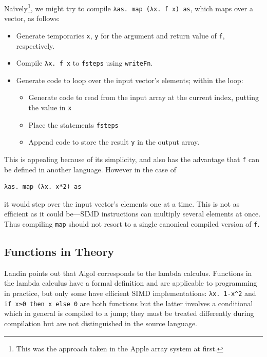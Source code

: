 \documentclass{article}
\begin{document}
Na\"ively\footnote{This was the approach taken in the Apple array system at first.}, we might try to compile \verb|λas. map (λx. f x) as|, which maps over a vector, as follows:

\begin{itemize}
  \item Generate temporaries \verb|x|, \verb|y| for the argument and return value of \verb|f|, respectively.
  \item Compile \verb|λx. f x| to \verb|fsteps| using \verb|writeFn|.
  \item Generate code to loop over the input vector's elements; within the loop:
    \begin{itemize}
      \item Generate code to read from the input array at the current index, putting the value in \verb|x|
      \item Place the statements \verb|fsteps|
      \item Append code to store the result \verb|y| in the output array.
    \end{itemize}
\end{itemize}

This is appealing because of its simplicity, and also has the advantage that \verb|f| can be defined in another language. However in the case of

\begin{verbatim}
λas. map (λx. x*2) as
\end{verbatim}

it would step over the input vector's elements one at a time. This is not as efficient as it could be---SIMD instructions can multiply several elements at once. Thus compiling \verb|map| should not resort to a single canonical compiled version of \verb|f|.


\subsection{Functions in Theory}

Landin \cite{landin1965} points out that Algol corresponds to the lambda calculus. Functions in the lambda calculus have a formal definition and are applicable to programming in practice, but only some have efficient SIMD implementations: \verb|λx. 1-x^2| and \verb|if x≥0 then x else 0| are both functions but the latter involves a conditional which in general is compiled to a jump; they must be treated differently during compilation but are not distinguished in the source language.
\end{document}
